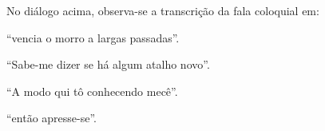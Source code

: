 \begin{myquote}

\end{myquote}

No diálogo acima, observa-se a transcrição da fala coloquial em:

\begin{escolha}
  
  \item ``vencia o morro a largas passadas''.
  
  \item ``Sabe-me dizer se há algum atalho novo''. 
  
  \item ``A modo qui tô conhecendo mecê''.
  
  \item ``então apresse-se''. 

\end{escolha}
